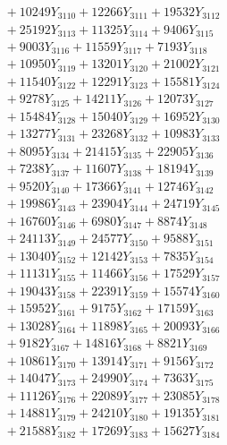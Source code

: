 \documentclass[a4paper,10pt]{article}
\begin{document}
{\begin{align}
&\;  + 10249 Y_{3110} + 12266 Y_{3111} + 19532 Y_{3112} \\[0.3ex]
&\;  + 25192 Y_{3113} + 11325 Y_{3114} + 9406 Y_{3115} \\[0.3ex]
&\;  + 9003 Y_{3116} + 11559 Y_{3117} + 7193 Y_{3118} \\[0.5ex]\allowbreak
&\;  + 10950 Y_{3119} + 13201 Y_{3120} + 21002 Y_{3121} \\[0.3ex]
&\;  + 11540 Y_{3122} + 12291 Y_{3123} + 15581 Y_{3124} \\[0.3ex]
&\;  + 9278 Y_{3125} + 14211 Y_{3126} + 12073 Y_{3127} \\[0.3ex]
&\;  + 15484 Y_{3128} + 15040 Y_{3129} + 16952 Y_{3130} \\[0.3ex]
&\;  + 13277 Y_{3131} + 23268 Y_{3132} + 10983 Y_{3133} \\[0.3ex]
&\;  + 8095 Y_{3134} + 21415 Y_{3135} + 22905 Y_{3136} \\[0.3ex]
&\;  + 7238 Y_{3137} + 11607 Y_{3138} + 18194 Y_{3139} \\[0.3ex]
&\;  + 9520 Y_{3140} + 17366 Y_{3141} + 12746 Y_{3142} \\[0.3ex]
&\;  + 19986 Y_{3143} + 23904 Y_{3144} + 24719 Y_{3145} \\[0.3ex]
&\;  + 16760 Y_{3146} + 6980 Y_{3147} + 8874 Y_{3148} \\[0.5ex]\allowbreak
&\;  + 24113 Y_{3149} + 24577 Y_{3150} + 9588 Y_{3151} \\[0.3ex]
&\;  + 13040 Y_{3152} + 12142 Y_{3153} + 7835 Y_{3154} \\[0.3ex]
&\;  + 11131 Y_{3155} + 11466 Y_{3156} + 17529 Y_{3157} \\[0.3ex]
&\;  + 19043 Y_{3158} + 22391 Y_{3159} + 15574 Y_{3160} \\[0.3ex]
&\;  + 15952 Y_{3161} + 9175 Y_{3162} + 17159 Y_{3163} \\[0.3ex]
&\;  + 13028 Y_{3164} + 11898 Y_{3165} + 20093 Y_{3166} \\[0.3ex]
&\;  + 9182 Y_{3167} + 14816 Y_{3168} + 8821 Y_{3169} \\[0.3ex]
&\;  + 10861 Y_{3170} + 13914 Y_{3171} + 9156 Y_{3172} \\[0.3ex]
&\;  + 14047 Y_{3173} + 24990 Y_{3174} + 7363 Y_{3175} \\[0.3ex]
&\;  + 11126 Y_{3176} + 22089 Y_{3177} + 23085 Y_{3178} \\[0.5ex]\allowbreak
&\;  + 14881 Y_{3179} + 24210 Y_{3180} + 19135 Y_{3181} \\[0.3ex]
&\;  + 21588 Y_{3182} + 17269 Y_{3183} + 15627 Y_{3184} \\[0.3ex]

\end{align}}
\end{document}

